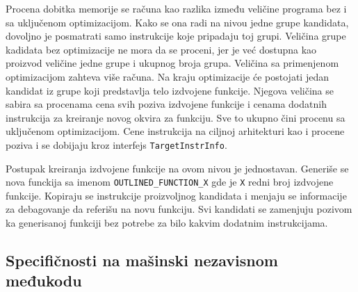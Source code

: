 \documentclass[12pt,oneside]{memoir}
\begin{document}
Procena dobitka memorije se računa kao razlika između veličine programa bez i sa uključenom optimizacijom.
Kako se ona radi na nivou jedne grupe kandidata, dovoljno je posmatrati samo instrukcije koje pripadaju toj grupi. %
Veličina grupe kadidata bez optimizacije ne mora da se proceni, jer je već dostupna kao proizvod veličine jedne grupe i ukupnog broja grupa.
Veličina sa primenjenom optimizacijom zahteva više računa.
Na kraju optimizacije će postojati jedan kandidat iz grupe koji predstavlja telo izdvojene funkcije.
Njegova veličina se sabira sa procenama cena svih poziva izdvojene funkcije i cenama dodatnih instrukcija za kreiranje novog okvira za funkciju.
Sve to ukupno čini procenu sa uključenom optimizacijom.
Cene instrukcija na ciljnoj arhitekturi kao i procene poziva i  se dobijaju kroz interfejs \verb|TargetInstrInfo|.

Postupak kreiranja izdvojene funkcije na ovom nivou je jednostavan.
Generiše se nova funckija sa imenom \verb|OUTLINED_FUNCTION_X| gde je \verb|X| redni broj izdvojene funkcije.
Kopiraju se instrukcije proizvoljnog kandidata i menjaju se informacije za debagovanje da referišu na novu funkciju.
Svi kandidati se zamenjuju pozivom ka generisanoj funkciji bez potrebe za bilo kakvim dodatnim instrukcijama.

\subsection{Specifičnosti na mašinski nezavisnom međukodu}

\end{document}
